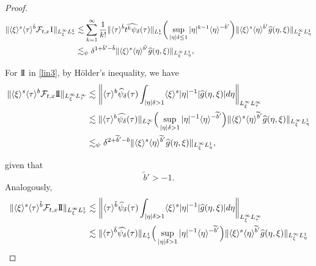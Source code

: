 \documentclass[%
11pt,  reqno]{amsart}
\newcommand{\jap}[1]{\langle #1 \rangle}
\newcommand{\I}{\hspace{0.2mm}\textup{I}\hspace{0.2mm}}
\newcommand{\II}{\textup{I \hspace{-2.9mm} I} }
\newcommand{\5}{\textup{V}}
\newcommand{\noi}{\noindent}
\newcommand{\ft}{\widehat}
\newcommand{\les}{\lesssim}
\newcommand{\dl}{\delta}
\newcommand{\F}{\mathcal{F}}
\newcommand{\wt}{\widetilde}
\theoremstyle{remark}
\numberwithin{equation}{section}
\numberwithin{theorem}{section}
\begin{document}
{\begin{proof}
\begin{equation}
				\begin{aligned}
					\| \jap{\xi}^s \jap{\tau}^{\tilde{b}} \F_{t,x} \I \|_{L^\infty_\xi L^1_\tau} & \les \sum_{k=1}^\infty \frac{1}{k!} \| \jap{\tau}^{\tilde{b}}\ft{t^k \psi_\dl} (\tau) \|_{L^1_\tau} \bigg( \sup_{|\eta|\dl \le 1} |\eta|^{k-1} \jap{\eta}^{-\tilde{b}'}  \bigg) \| \jap{\xi}^s \jap{\eta}^{\tilde{b}'} \ft{g}(\eta, \xi) \|_{L^\infty_\xi L^1_\eta} \\
					& \les_\psi \dl^{1+ \tilde{b}' -\tilde{b}} \| \jap{\xi}^s \jap{\eta}^{\tilde{b'}} \ft{g}(\eta, \xi) \|_{L^\infty_\xi L^1_\eta},
				\end{aligned}
				\label{lin4c}
			\end{equation}
			
			
			
			\noi
			For $\II$ in \eqref{lin3}, by H\"older's inequality, we have
			\begin{equation}
				\begin{aligned}
					\| \jap{\xi}^s \jap{\tau}^b \F_{t,x} \II \|_{L^\infty_\xi L^\infty_\tau} & \les \bigg\| \jap{\tau}^b \ft{\psi}_\dl(\tau) \int_{|\eta|\dl >1} \jap{\xi}^s |\eta|^{-1} | \ft{g}(\eta, \xi)| d\eta \bigg\|_{L^\infty_\xi L^\infty_\tau} \\
					& \les \| \jap{\tau}^b \ft{\psi_\dl}(\tau) \|_{L^\infty_\tau} \Big( \sup_{|\eta| \dl >1} |\eta|^{-1} \jap{\eta}^{-\wt{b}'} \Big) \| \jap{\xi}^s \jap{\eta}^{\wt{b}'} \ft{g}(\eta, \xi) \|_{L^\infty_\xi L^1_\eta} \\
					& \les_\psi \dl^{2 + \wt{b}' - b} \| \jap{\xi}^s \jap{\eta}^{\wt{b}'} \ft{g}(\eta, \xi) \|_{L^\infty_\xi L^1_\eta},
				\end{aligned}
				\label{lin5a}
			\end{equation}
			
			\noi
			given that
			\begin{equation}
				\wt{b}'>-1.
				\label{lin5b}
			\end{equation}
			Analogously,
			\begin{equation}
				\begin{aligned}
					\| \jap{\xi}^s \jap{\tau}^{\tilde{b}} \F_{t,x} \II \|_{L^\infty_\xi L^1_\tau} & \les \bigg\| \jap{\tau}^{\tilde{b}} \ft{\psi}_\dl(\tau) \int_{|\eta|\dl >1} \jap{\xi}^s |\eta|^{-1} | \ft{g}(\eta, \xi)| d\eta \bigg\|_{L^\infty_\xi L^\infty_\tau} \\
					& \les \| \jap{\tau}^{\tilde{b}} \ft{\psi_\dl}(\tau) \|_{L^1_\tau} \Big( \sup_{|\eta| \dl >1} |\eta|^{-1} \jap{\eta}^{-\wt{b}'} \Big) \| \jap{\xi}^s \jap{\eta}^{\wt{b}'} \ft{g}(\eta, \xi) \|_{L^\infty_\xi L^1_\eta} \\
				\end{aligned}
				\label{lin5c}
			\end{equation}
			

\end{proof}}
\end{document}
